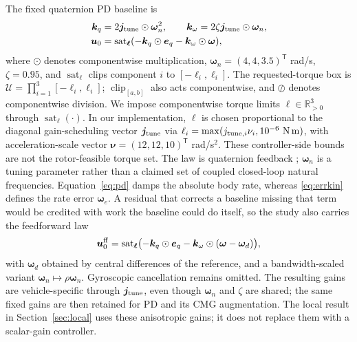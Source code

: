 \documentclass[letterpaper, 10 pt, conference]{ieeeconf}
\newcommand{\T}{^{\mathsf T}}
\newcommand{\sat}{\operatorname{sat}}
\newcommand{\clip}{\operatorname{clip}}
\begin{document}
The fixed quaternion PD baseline is
\begin{align}
 \bm k_q&=2\bm j_{\rm tune}\odot\bm\omega_n^2,\qquad
 \bm k_\omega=2\zeta\bm j_{\rm tune}\odot\bm\omega_n,\\
 \bm u_0&=\sat_{\bm\ell}
       (-\bm k_q\odot\bm e_q-\bm k_\omega\odot\bm\omega),
 \label{eq:pd}
\end{align}
where $\odot$ denotes componentwise multiplication,
$\bm\omega_n=(4,4,3.5)\T$ rad/s, $\zeta=0.95$, and
$\sat_{\bm\ell}$ clips component $i$ to $[-\ell_i,\ell_i]$.
%
The requested-torque box is $\mathcal U=\prod_{i=1}^3[-\ell_i,\ell_i]$;
$\clip_{[a,b]}$ also acts componentwise, and $\oslash$ denotes componentwise division.
We impose componentwise torque limits $\bm\ell\in\mathbb R_{>0}^3$ through $\sat_{\bm\ell}(\cdot)$. In our implementation, $\bm\ell$ is chosen proportional to the diagonal gain-scheduling vector $\bm j_{\rm tune}$ via
$\ell_i=\max(j_{{\rm tune},i}\nu_i,10^{-6}\ \mathrm{N\,m})$,
with acceleration-scale vector $\bm\nu=(12,12,10)\T$ rad/s$^2$.
These controller-side bounds are not the rotor-feasible torque set.
%
The law is quaternion feedback \cite{fresk2013quaternion}; $\bm\omega_n$ is a tuning parameter rather than a claimed set of coupled closed-loop natural frequencies.
Equation~\eqref{eq:pd} damps the absolute body rate, whereas \eqref{eq:errkin} defines the rate error $\bm\omega_e$. A residual that corrects a baseline missing that term would be credited with work the baseline could do itself, so the study also carries the feedforward law
\begin{equation}
 \bm u_0^{\rm ff}=\sat_{\bm\ell}\bigl(-\bm k_q\odot\bm e_q-\bm k_\omega\odot(\bm\omega-\bm\omega_d)\bigr),
 \label{eq:pdff}
\end{equation}
with $\bm\omega_d$ obtained by central differences of the reference, and a bandwidth-scaled variant $\bm\omega_n\!\mapsto\!\rho\bm\omega_n$. Gyroscopic cancellation remains omitted.
The resulting gains are vehicle-specific through $\bm j_{\rm tune}$, even though
$\bm\omega_n$ and $\zeta$ are shared; the same fixed gains are then retained
for PD and its CMG augmentation.
The local result in Section~\ref{sec:local} uses these anisotropic gains; it does not replace them with a scalar-gain controller.
%
\end{document}
